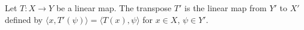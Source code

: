 Let $T: X \to Y$ be a linear map. The transpose $T'$ is the linear map from $Y'$ to $X'$ defined by $\langle x, T'(\psi) \rangle = \langle T(x), \psi \rangle$ for $x \in X$, $\psi \in Y'$.
